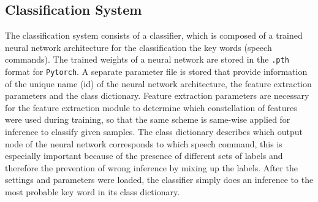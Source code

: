 


\subsection{Classification System}
The classification system consists of a classifier, which is composed of a trained neural network architecture for the classification the key words (speech commands).
The trained weights of a neural network are stored in the \texttt{.pth} format for \texttt{Pytorch}.
A separate parameter file is stored that provide information of the unique name (id) of the neural network architecture, the feature extraction parameters and the class dictionary.
Feature extraction parameters are necessary for the feature extraction module to determine which constellation of features were used during training, so that the same scheme is same-wise applied for inference to classify given samples.
The class dictionary describes which output node of the neural network corresponds to which speech command, this is especially important because of the presence of different sets of labels and therefore the prevention of wrong inference by mixing up the labels.
After the settings and parameters were loaded, the classifier simply does an inference to the most probable key word in its class dictionary.

